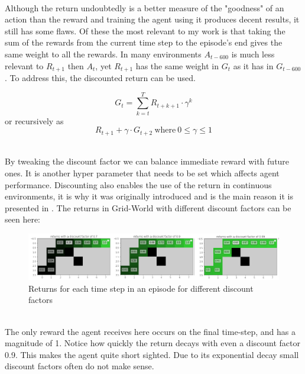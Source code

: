 \noindent
\\ Although the return undoubtedly is a better measure of the "goodness" of an action than the reward and training the agent using it produces decent results, it still has some flaws. Of these the most relevant to my work is that taking the sum of the rewards from the current time step to the episode's end gives the same weight to all the rewards. In many environments $A_{t-600}$ is much less relevant to $R_{t+1}$ then $A_t$, yet $R_{t+1}$ has the same weight in $G_{t}$ as it has in $G_{t-600}$. To address this, the discounted return can be used. 

\begin{equation}\label{MDP:discounted_return}
    G_t = \sum_{k=t}^{T} R_{t+k+1} \cdot \gamma ^k 
\end{equation}
or recursively as
\begin{equation}\label{MDP:recursive_discounted_return}
    R_{t+1} + \gamma \cdot G_{t+2} \mathrm{\ where\ } 0 \leq \gamma \leq 1
\end{equation}
\centerline{\small{}}

\noindent
\\ By tweaking the discount factor we can balance immediate reward with future ones. It is another hyper parameter that needs to be set which affects agent performance. Discounting also enables the use of the return in continuous environments, it is why it was originally introduced and is the main reason it is presented in \cite{sutton_reinforcement_2018}. The returns in Grid-World with different discount factors can be seen here:

\begin{figure}[h!]
    \centering
    \includegraphics[width=\linewidth]{figures/grid_world_discount_factors.png}
    \caption{Returns for each time step in an episode for different discount factors}
    \label{fig:grid_world_discount_factors}
\end{figure}

\noindent
\\ The only reward the agent receives here occurs on the final time-step, and has a magnitude of 1. Notice how quickly the return decays with even a discount factor 0.9. This makes the agent quite short sighted. Due to its exponential decay small discount factors often do not make sense.

